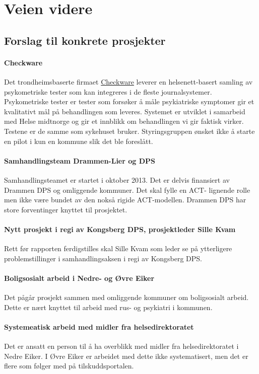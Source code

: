 \documentclass[11pt]{report} %
\begin{document}
              \chapter{Veien videre}\label{chap:vvidere}
                \section{Forslag til konkrete prosjekter}\label{chap:vvidere_konkpr}
                  \subsubsection{Checkware} 
                    Det trondheimsbaserte firmaet \href{http://checkware.com/}{Checkware} leverer en helsenett-basert samling av psykometriske tester som kan integreres i de fleste journalsystemer. Psykometriske tester er tester som forsøker å måle psykiatriske symptomer gir et kvalitativt mål på behandlingen som leveres. Systemet er utviklet i samarbeid med Helse midtnorge og gir et innblikk om behandlingen vi gir faktisk virker. Testene er de samme som sykehuset bruker. Styringsgruppen ønsket ikke å starte en pilot i kun en kommune slik det ble foreslått.
                  \subsubsection{Samhandlingsteam Drammen-Lier og DPS}
                    Samhandlingsteamet er startet i oktober 2013. Det er delvis finansiert av Drammen DPS og omliggende kommuner. Det skal fylle en ACT- lignende rolle men ikke være bundet av den nokså rigide ACT-modellen. Drammen DPS har store forventinger knyttet til prosjektet.
                  \subsubsection{Nytt prosjekt i regi av Kongsberg DPS, prosjektleder Sille Kvam}
                    Rett før rapporten ferdigstilles skal Sille Kvam som leder se på ytterligere problemstillinger i samhandlingsaksen i regi av Kongsberg DPS. 
                  \subsubsection{Boligsosialt arbeid i Nedre- og Øvre Eiker}
                    Det pågår prosjekt sammen med omliggende kommuner om boligsosialt arbeid. Dette er nært knyttet til arbeid med rus- og psykiatri i kommunen.
                  \subsubsection{Systemeatisk arbeid med midler fra helsedirektoratet}
                    Det er ansatt en person til å ha overblikk med midler fra helsedirektoratet i Nedre Eiker. I Øvre Eiker er arbeidet med dette ikke systematisert, men det er flere som følger med på tilskuddsportalen.
\end{document}
